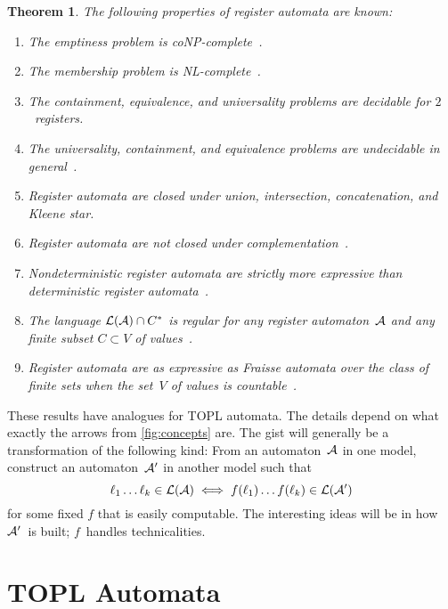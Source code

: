 \documentclass[9pt, preprint]{sigplanconf} %
\newtheorem{theorem}{Theorem}
\theoremstyle{definition}
\theoremstyle{remark}
\begin{document}
\begin{theorem}\label{th:ra}
The following properties of register automata are known:
\begin{enumerate}
\item The emptiness problem is coNP-complete~\cite{dblp:journals/tcs/sakamotoi00}.
\item The membership problem is NL-complete~\cite{dblp:conf/mfcs/nevensv01}.
\item The containment, equivalence, and universality problems are decidable for $2$~registers.~\cite{dblp:conf/focs/kaminskif90}
\item The universality, containment, and equivalence problems are undecidable in general~\cite{dblp:conf/mfcs/nevensv01}.
\item Register automata are closed under union, intersection, concatenation, and Kleene star.~\cite{dblp:conf/focs/kaminskif90}
\item Register automata are \emph{not} closed under complementation~\cite{dblp:conf/focs/kaminskif90}.
\item Nondeterministic register automata are strictly more expressive than deterministic register automata~\cite{dblp:conf/focs/kaminskif90}.
\item The language ${\cal L}({\cal A})\cap C^*$ is regular for any register automaton~${\cal A}$ and any finite subset $C\subset V$ of values~\cite{dblp:conf/focs/kaminskif90}.
\item Register automata are as expressive as Fraisse automata over the class of finite sets when the set~$V$ of values is countable~\cite{dblp:conf/lics/bojanczykkl11}.
\end{enumerate}
\end{theorem}

These results have analogues for TOPL automata.
The details depend on what exactly the arrows from \autoref{fig:concepts} are.
The gist will generally be a transformation of the following kind:
From an automaton~${\cal A}$ in one model, construct an automaton~${\cal A}'$ in another model such that
\[ \ell_1\ldots \ell_k \in {\cal L}({\cal A})
  \iff
f(\ell_1)\ldots f(\ell_k)\in{\cal L}({\cal A}') \]
for some fixed $f$ that is easily computable.
The interesting ideas will be in how ${\cal A}'$~is built;
$f$~handles technicalities.

\section{TOPL Automata}\label{sec:topl_automata} %
\end{document}
